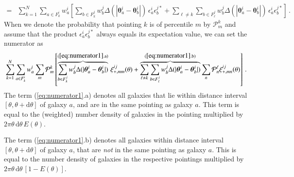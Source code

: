 \documentclass[referee]{aa} %
\renewcommand{\[}{\begin{equation}}
\renewcommand{\]}{\end{equation}}
\renewcommand{\rm}{\mathrm}
\def\b#1{\bm{#1}}
\begin{document}
\begin{appendix}
\begin{align}
  = & \sum_{k=1}^N\sum_{a\in F_k^i}w_a^i \left[\sum_{b\in F_{k}^j} w_b^j \Delta(|\b\theta_a^i-\b\theta_b^i|)\, \epsilon_a^i\epsilon_b^{j*} + \sum_{\ell\neq k} \sum_{b\in F_{\ell}^j} w_b^j \Delta(|\b\theta_a^i-\b\theta_b^i|)\, \epsilon_a^i\epsilon_b^{j*}\right] \, .
\end{align}
When we denote the probability that pointing $k$ is of percentile $m$ by $\mathcal{P}_m^k$ and assume that the product $\epsilon_a^i\epsilon_b^{j*}$ always equals its expectation value, we can set the numerator as \[
\sum_{k=1}^N\sum_{a\in F_k^i}w_a^i \sum_m \mathcal{P}_m^k \left[\overbrace{\sum_{b\in F_{k}^j} w_b^j \Delta(|\b\theta_a^i-\b\theta_b^i|)}^{\rm{(\ref{eq:numerator1}.a)}}\,  \xi_{+,mm}^{ij}(\theta) + \overbrace{\sum_{\ell\neq k} \sum_{b\in F_{\ell}^j} w_b^j \Delta(|\b\theta_a^i-\b\theta_b^i|)}^{\rm{(\ref{eq:numerator1}.b)}} \sum_n \mathcal{P}_n^{\ell} \xi_{+,mn}^{ij}(\theta)\right] \, .
\label{eq:numerator1}
\]
The term (\ref{eq:numerator1}.a) denotes all galaxies that lie within distance interval $[\theta,\theta+{\rm d}\theta]$ of galaxy $a$, and are in the same pointing as galaxy $a$. This term is equal to the (weighted) number density of galaxies in the pointing multiplied by $2\pi\theta\, {\rm d}\theta\, E(\theta)$. 

The term (\ref{eq:numerator1}.b) denotes all galaxies within distance interval $[\theta,\theta+{\rm d}\theta]$ of galaxy $a$, that are \textit{not} in the same pointing as galaxy $a$. This is equal to the number density of galaxies in the respective pointings multiplied by $2\pi\theta\, {\rm d}\theta\, [1-E(\theta)]$. 
 

\end{appendix}
\end{document}
